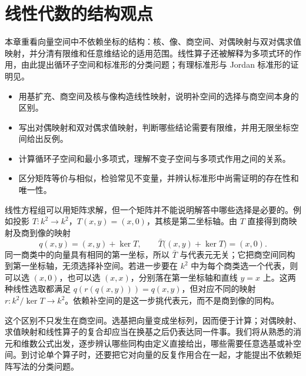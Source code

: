 
\chapter{线性代数的结构观点}
\label{b2:ch:01}

\begin{chapterabstract}
	本章重看向量空间中不依赖坐标的结构：核、像、商空间、对偶映射与双对偶求值映射，并分清有限维和任意维结论的适用范围。线性算子还被解释为多项式环的作用，由此提出循环子空间和标准形的分类问题；有理标准形与 Jordan 标准形的证明见。
\end{chapterabstract}

\begin{learninggoals}
	\begin{itemize}
		\item 用基扩充、商空间及核与像构造线性映射，说明补空间的选择与商空间本身的区别。
		\item 写出对偶映射和双对偶求值映射，判断哪些结论需要有限维，并用无限坐标空间给出反例。
		\item 计算循环子空间和最小多项式，理解不变子空间与多项式作用之间的关系。
		\item 区分矩阵等价与相似，检验常见不变量，并辨认标准形中尚需证明的存在性和唯一性。
	\end{itemize}
\end{learninggoals}

线性方程组可以用矩阵求解，但一个矩阵并不能说明解答中哪些选择是必要的。例如投影 \(T:k^2\to k^2\)，\(T(x,y)=(x,0)\)，其核是第二坐标轴。由 \(T\) 直接得到商映射及商到像的映射
\[
	q(x,y)=(x,y)+\ker T,\qquad \bar T\bigl((x,y)+\ker T\bigr)=(x,0).
\]
同一商类中的向量具有相同的第一坐标，所以 \(\bar T\) 与代表元无关；它把商空间同构到第一坐标轴，无须选择补空间。若进一步要在 \(k^2\) 中为每个商类选一个代表，则可以选 \((x,0)\)，也可以选 \((x,x)\)，分别落在第一坐标轴和直线 \(y=x\) 上。这两种线性选取都满足 \(q(r(q(x,y)))=q(x,y)\)，但对应不同的映射 \(r:k^2/\ker T\to k^2\)。依赖补空间的是这一步挑代表元，而不是商到像的同构。

\ProseParagraphBreak

这个区别不只发生在商空间。选基把向量变成坐标列，因而便于计算；对偶映射、求值映射和线性算子的复合却应当在换基之后仍表达同一件事。我们将从熟悉的消元和维数公式出发，逐步辨认哪些同构由定义直接给出，哪些需要任意选基或补空间。到讨论单个算子时，还要把它对向量的反复作用合在一起，才能提出不依赖矩阵写法的分类问题。

